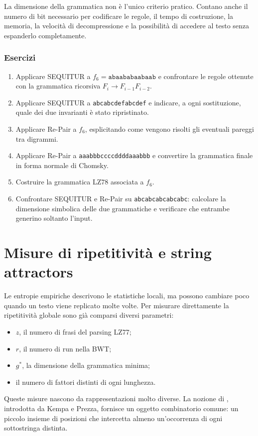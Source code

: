 \documentclass{article}
\theoremstyle{definition}
\numberwithin{equation}{section}
\begin{document}
La dimensione della grammatica non è l'unico criterio pratico. Contano anche il
numero di bit necessario per codificare le regole, il tempo di costruzione, la
memoria, la velocità di decompressione e la possibilità di accedere al testo
senza espanderlo completamente.

\subsubsection{Esercizi}
\begin{enumerate}
    \item Applicare SEQUITUR a $f_6=\texttt{abaababaabaab}$ e confrontare le
          regole ottenute con la grammatica ricorsiva $F_i\to F_{i-1}F_{i-2}$.
    \item Applicare SEQUITUR a \texttt{abcabcdefabcdef} e indicare, a ogni
          sostituzione, quale dei due invarianti è stato ripristinato.
    \item Applicare Re-Pair a $f_6$, esplicitando come vengono risolti gli
          eventuali pareggi tra digrammi.
    \item Applicare Re-Pair a \texttt{aaabbbccccddddaaabbb} e convertire la
          grammatica finale in forma normale di Chomsky.
    \item Costruire la grammatica LZ78 associata a $f_6$.
    \item Confrontare SEQUITUR e Re-Pair su
          \texttt{abcabcabcabcabc}: calcolare la dimensione simbolica delle
          due grammatiche e verificare che entrambe generino soltanto l'input.
\end{enumerate}

\section{Misure di ripetitività e string attractors}
Le entropie empiriche descrivono le statistiche locali, ma possono cambiare
poco quando un testo viene replicato molte volte. Per misurare direttamente la
ripetitività globale sono già comparsi diversi parametri:
\begin{itemize}
    \item $z$, il numero di frasi del parsing LZ77;
    \item $r$, il numero di run nella BWT;
    \item $g^*$, la dimensione della grammatica minima;
    \item il numero di fattori distinti di ogni lunghezza.
\end{itemize}
Queste misure nascono da rappresentazioni molto diverse. La nozione di
\textbf{}, introdotta da Kempa e Prezza, fornisce un
oggetto combinatorio comune: un piccolo insieme di posizioni che intercetta
almeno un'occorrenza di ogni sottostringa distinta.
\end{document}
